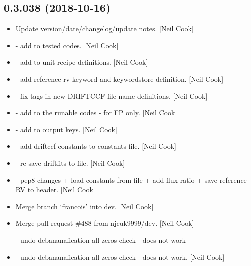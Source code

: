 \documentclass[a4paper,10pt,english]{report}
\begin{document}
\subsection{0.3.038 (2018-10-16)}
\label{\detokenize{misc/changelog:id291}}\begin{itemize}
\item {} 
Update version/date/changelog/update notes. {[}Neil Cook{]}

\item {} 
 - add  to tested codes. {[}Neil
Cook{]}

\item {} 
 - add  to unit recipe
definitions. {[}Neil Cook{]}

\item {} 
 - add reference rv keyword and keywordstore
definition. {[}Neil Cook{]}

\item {} 
 - fix tags in new DRIFTCCF file name definitions. {[}Neil
Cook{]}

\item {} 
 - add  to the runable codes
- for FP only. {[}Neil Cook{]}

\item {} 
 - add  to output keys. {[}Neil
Cook{]}

\item {} 
 - add driftccf constants to constants file.
{[}Neil Cook{]}

\item {} 
 - re-save driftfits to file. {[}Neil Cook{]}

\item {} 
 - pep8 changes + load constants from file
+ add flux ratio + save reference RV to header. {[}Neil Cook{]}

\item {} 
Merge branch ‘francois’ into dev. {[}Neil Cook{]}

\item {} 
Merge pull request \#488 from njcuk9999/dev. {[}Neil Cook{]}

 - undo debananafication all zeros check - does not work

\item {} 
 - undo debananafication all zeros check - does not
work. {[}Neil Cook{]}

\end{itemize}
\end{document}
